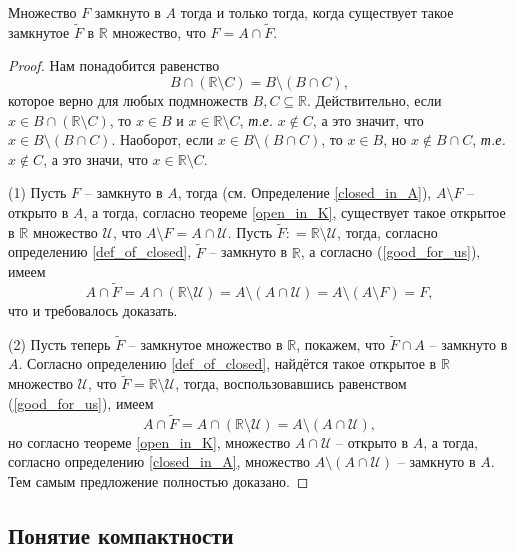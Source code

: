 \begin{proposition}\label{closed_in_A_if}
    Множество $F$ замкнуто в $A$ тогда и только тогда, когда существует такое замкнутое $\widetilde{F}$ в $\mathbb{R}$ множество, что $F  = A \cap \widetilde{F}.$
\end{proposition}

\begin{proof}
    Нам понадобится равенство 
\begin{equation}\label{good_for_us}
     B \cap (\mathbb{R} \setminus C) = B \setminus (B \cap C),
\end{equation}
которое верно для любых подмножеств $B,C \subseteq \mathbb{R}$.
Действительно, если $x \in B \cap (\mathbb{R} \setminus C)$, то $x \in B$ и $x \in \mathbb{R} \setminus C$, \textit{т.е.} $x \notin C$, а это значит, что $x \in B \setminus (B \cap C)$. Наоборот, если $x \in B \setminus (B \cap C)$, то $x \in B$, но $x \notin B \cap C$, \textit{т.е.} $x \notin C$, а это значи, что $x \in \mathbb{R} \setminus C$.

(1) Пусть $F$ -- замкнуто в $A$, тогда (см. Определение \ref{closed_in_A}), $A\setminus F$ -- открыто в $A$, а тогда, согласно теореме \ref{open_in_K}, существует такое открытое в $\mathbb{R}$ множество $\mathscr{U}$, что $A \setminus F = A \cap \mathscr{U}$. Пусть $\widetilde{F}: = \mathbb{R} \setminus\mathscr{U}$, тогда, согласно определению \ref{def_of_closed}, $\widetilde{F}$ -- замкнуто в $\mathbb{R}$, а согласно (\ref{good_for_us}), имеем
\[
 A \cap \widetilde{F} = A \cap (\mathbb{R}\setminus \mathscr{U}) = A \setminus (A \cap \mathscr{U}) = A\setminus(A \setminus F) = F, 
\]
что и требовалось доказать.

(2) Пусть теперь $\widetilde{F}$ -- замкнутое множество в $\mathbb{R}$, покажем, что $\widetilde{F} \cap A$ -- замкнуто в $A.$ Согласно определению \ref{def_of_closed}, найдётся такое открытое в $\mathbb{R}$ множество $\mathscr{U}$, что $\widetilde{F} = \mathbb{R}\setminus \mathscr{U}$, тогда, воспользовавшись равенством (\ref{good_for_us}), имеем
\[
  A \cap \widetilde{F} = A \cap (\mathbb{R}\setminus \mathscr{U}) = A \setminus (A \cap \mathscr{U}),
\]
но согласно теореме \ref{open_in_K}, множество $A \cap \mathscr{U}$ -- открыто в $A$, а тогда, согласно определению \ref{closed_in_A}, множество $A \setminus (A \cap \mathscr{U})$ -- замкнуто в $A$. Тем самым предложение полностью доказано.
\end{proof}


\subsection{Понятие компактности}

